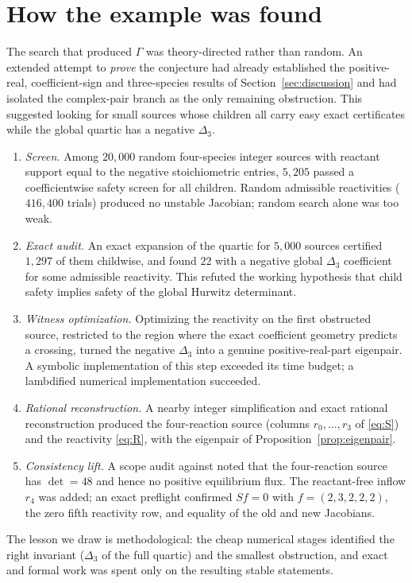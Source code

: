 \documentclass[11pt,a4paper]{article}
\theoremstyle{definition}
\theoremstyle{remark}
\begin{document}
\section{How the example was found}\label{sec:discovery}

The search that produced $\Gamma$ was theory-directed rather than random. An extended attempt to \emph{prove} the conjecture had already established the positive-real, coefficient-sign and three-species results of Section~\ref{sec:discussion} and had isolated the complex-pair branch as the only remaining obstruction. This suggested looking for small sources whose children all carry easy exact certificates while the global quartic has a negative $\Delta_3$.

\begin{enumerate}[label=\arabic*.]
\item \emph{Screen.} Among $20{,}000$ random four-species integer sources with reactant support equal to the negative stoichiometric entries, $5{,}205$ passed a coefficientwise safety screen for all children. Random admissible reactivities ($416{,}400$ trials) produced no unstable Jacobian; random search alone was too weak.
\item \emph{Exact audit.} An exact expansion of the quartic for $5{,}000$ sources certified $1{,}297$ of them childwise, and found $22$ with a negative global $\Delta_3$ coefficient for some admissible reactivity. This refuted the working hypothesis that child safety implies safety of the global Hurwitz determinant.
\item \emph{Witness optimization.} Optimizing the reactivity on the first obstructed source, restricted to the region where the exact coefficient geometry predicts a crossing, turned the negative $\Delta_3$ into a genuine positive-real-part eigenpair. A symbolic implementation of this step exceeded its time budget; a lambdified numerical implementation succeeded.
\item \emph{Rational reconstruction.} A nearby integer simplification and exact rational reconstruction produced the four-reaction source (columns $r_0,\dots,r_3$ of \eqref{eq:S}) and the reactivity \eqref{eq:R}, with the eigenpair of Proposition~\ref{prop:eigenpair}.
\item \emph{Consistency lift.} A scope audit against \cite{VassenaStadler2024} noted that the four-reaction source has $\det=48$ and hence no positive equilibrium flux. The reactant-free inflow $r_4$ was added; an exact preflight confirmed $Sf=0$ with $f=(2,3,2,2,2)$, the zero fifth reactivity row, and equality of the old and new Jacobians.
\end{enumerate}
The lesson we draw is methodological: the cheap numerical stages identified the right invariant ($\Delta_3$ of the full quartic) and the smallest obstruction, and exact and formal work was spent only on the resulting stable statements.
\end{document}
